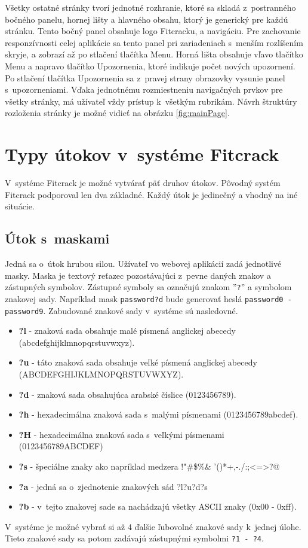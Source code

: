 \documentclass[slovak]{fitthesis}
\begin{document}
Všetky ostatné stránky tvorí jednotné rozhranie, ktoré sa skladá z~postranného bočného panelu, hornej lišty a hlavného obsahu, ktorý je generický pre každú stránku. Tento bočný panel obsahuje logo Fitcracku, a navigáciu. Pre zachovanie responzívnosti celej aplikácie sa tento panel pri zariadeniach  s~menším rozlíšením skryje, a zobrazí až po stlačení tlačítka Menu. Horná lišta obsahuje vľavo tlačítko Menu a napravo tlačítko Upozornenia, ktoré indikuje počet nových upozornení. Po stlačení tlačítka Upozornenia sa z~pravej strany obrazovky vysunie panel s~upozorneniami. Vďaka jednotnému rozmiestneniu navigačných prvkov pre všetky stránky, má užívateľ vždy prístup k~všetkým rubrikám. Návrh štruktúry rozloženia stránky je možné vidieť na obrázku \ref{fig:mainPage}.


\section{Typy útokov v~systéme Fitcrack}
V~systéme Fitcrack je možné vytvárať päť druhov útokov. Pôvodný systém Fitcrack podporoval len dva základné. Každý útok je jedinečný a vhodný na iné situácie.


\subsection{Útok s~maskami} \label{maskAttack}
Jedná sa o~útok hrubou silou. Užívateľ  vo webovej aplikácií zadá jednotlivé masky. Maska je textový reťazec pozostávajúci z~pevne daných znakov a zástupných symbolov. Zástupné symboly sa označujú znakom ''\texttt{?}'' a symbolom znakovej sady. Napríklad mask \texttt{password?d} bude generovať heslá \texttt{password0 - password9}. Zabudované znakové sady v~systéme sú nasledovné.
\begin{itemize}
    \item \textbf{?l} - znaková sada obsahuje malé písmená anglickej abecedy (abcdefghijklmnopqrstuvwxyz).
    \item \textbf{?u} - táto znaková sada obsahuje veľké písmená anglickej abecedy (ABCDEFGHIJKLMNOPQRSTUVWXYZ).
    \item \textbf{?d} - znaková sada obsahujúca arabské číslice (0123456789).
    \item \textbf{?h} - hexadecimálna znaková sada s~malými písmenami (0123456789abcdef).
    \item \textbf{?H} - hexadecimálna znaková sada s~veľkými písmenami (0123456789ABCDEF)
    \item \textbf{?s} - špeciálne znaky ako napríklad medzera !"\#\$\%\&
    '()*+,-./:;<=>?@
    \item \textbf{?a} - jedná sa o~zjednotenie znakových sád ?l?u?d?s
    \item \textbf{?b} - v~tejto znakovej sade sa nachádzajú všetky ASCII znaky (0x00 - 0xff).
\end{itemize}
V~systéme je možné vybrať si až 4 ďalšie ľubovolné znakové sady k~jednej úlohe. Tieto znakové sady sa potom zadávajú zástupnými symbolmi \texttt{?1 - ?4}.
\end{document}
